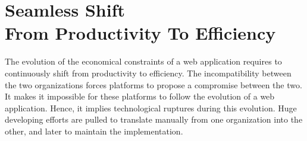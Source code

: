 \chapter{Seamless Shift\\From Productivity To Efficiency} \label{chapter4}
\minitoc
\eject

The evolution of the economical constraints of a web application requires to continuously shift from productivity to efficiency.
The incompatibility between the two organizations forces platforms to propose a compromise between the two.
It makes it impossible for these platforms to follow the evolution of a web application.
Hence, it implies technological ruptures during this evolution.
Huge developing efforts are pulled to translate manually from one organization into the other, and later to maintain the implementation. %








% 